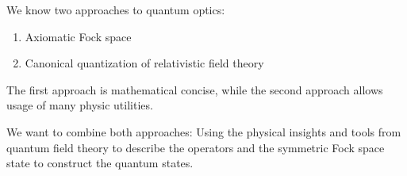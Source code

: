 We know two approaches to quantum optics:
\begin{enumerate}
    \item Axiomatic Fock space
    \item Canonical quantization of relativistic field theory
\end{enumerate}
The first approach is mathematical concise, while the second approach allows usage of many physic utilities.

We want to combine both approaches:
Using the physical insights and tools from quantum field theory to describe the operators and the symmetric Fock space state to construct the quantum states.
